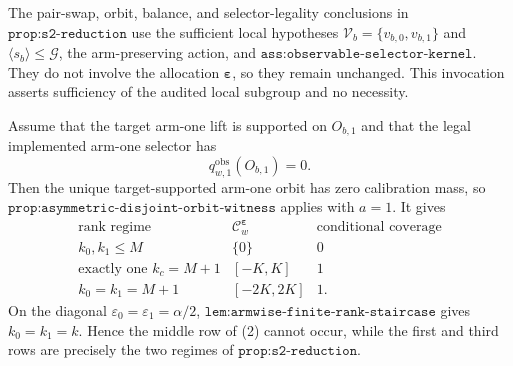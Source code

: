 The pair-swap, orbit, balance, and selector-legality conclusions in \(\texttt{prop:s2-reduction}\) use the sufficient local hypotheses \(\mathcal V_b=\{v_{b,0},v_{b,1}\}\) and \(\langle s_b\rangle\le\mathcal G\), the arm-preserving action, and \(\texttt{ass:observable-selector-kernel}\). They do not involve the allocation \(\boldsymbol\varepsilon\), so they remain unchanged. This invocation asserts sufficiency of the audited local subgroup and no necessity.

Assume that the target arm-one lift is supported on \(O_{b,1}\) and that the legal implemented arm-one selector has
\[
q^{\mathrm{obs}}_{w,1}(O_{b,1})=0.
\tag{1}
\]
Then the unique target-supported arm-one orbit has zero calibration mass, so \(\texttt{prop:asymmetric-disjoint-orbit-witness}\) applies with \(a=1\). It gives
\[
\begin{array}{c|c|c}
\text{rank regime}
&
\mathcal C^{\boldsymbol\varepsilon}_w
&
\text{conditional coverage}
\\ \hline
k_0,k_1\le M&\{0\}&0\\
\text{exactly one }k_c=M+1&[-K,K]&1\\
k_0=k_1=M+1&[-2K,2K]&1.
\end{array}
\tag{2}
\]
On the diagonal \(\varepsilon_0=\varepsilon_1=\alpha/2\), \(\texttt{lem:armwise-finite-rank-staircase}\) gives \(k_0=k_1=k\). Hence the middle row of (2) cannot occur, while the first and third rows are precisely the two regimes of \(\texttt{prop:s2-reduction}\).
